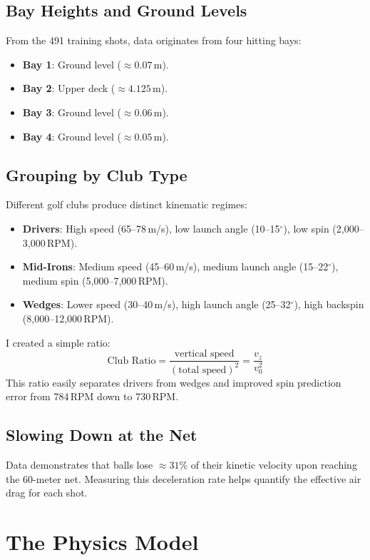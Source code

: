 \documentclass[11pt,a4paper]{article}
\begin{document}
\subsection{Bay Heights and Ground Levels}
From the 491 training shots, data originates from four hitting bays:
\begin{itemize}
    \item \textbf{Bay 1}: Ground level ($\approx 0.07$\,m).
    \item \textbf{Bay 2}: Upper deck ($\approx 4.125$\,m).
    \item \textbf{Bay 3}: Ground level ($\approx 0.06$\,m).
    \item \textbf{Bay 4}: Ground level ($\approx 0.05$\,m).
\end{itemize}

\subsection{Grouping by Club Type}
Different golf clubs produce distinct kinematic regimes:
\begin{itemize}
    \item \textbf{Drivers}: High speed (65--78\,m/s), low launch angle (10--15$^\circ$), low spin (2,000--3,000\,RPM).
    \item \textbf{Mid-Irons}: Medium speed (45--60\,m/s), medium launch angle (15--22$^\circ$), medium spin (5,000--7,000\,RPM).
    \item \textbf{Wedges}: Lower speed (30--40\,m/s), high launch angle (25--32$^\circ$), high backspin (8,000--12,000\,RPM).
\end{itemize}

I created a simple ratio:
\begin{equation}
\text{Club Ratio} = \frac{\text{vertical speed}}{(\text{total speed})^2} = \frac{v_z}{v_0^2}
\end{equation}
This ratio easily separates drivers from wedges and improved spin prediction error from 784\,RPM down to 730\,RPM.

\subsection{Slowing Down at the Net}
Data demonstrates that balls lose $\approx 31\%$ of their kinetic velocity upon reaching the 60-meter net. Measuring this deceleration rate helps quantify the effective air drag for each shot.

\section{The Physics Model}
\end{document}
